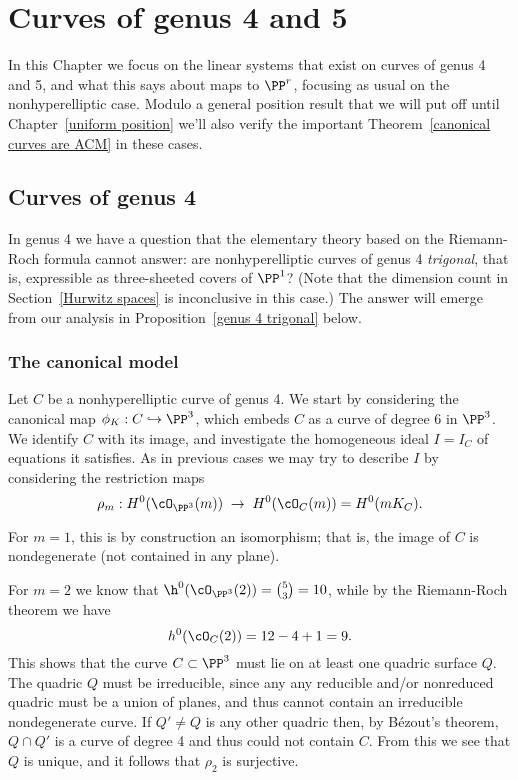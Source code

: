 

\chapter{Curves of genus 4 and 5}\label{genus 4, 5 Chapter}

In this Chapter we focus on the linear systems that exist on curves of genus 4 and 5, and what this says about maps to $\PP^r$, focusing as usual on the nonhyperelliptic case. Modulo a general position result that we will put off until Chapter~\ref{uniform position} we'll also verify the
important Theorem~\ref{canonical curves are ACM} in these cases.



\section{Curves of genus 4}

In genus 4 we have a question that the elementary theory based on the Riemann-Roch formula cannot answer: are nonhyperelliptic curves of genus 4 \emph{trigonal}, that is, expressible as three-sheeted covers of $\PP^1$? (Note that the dimension count in Section~\ref{Hurwitz spaces} is inconclusive in this case.)
The answer will emerge from our analysis in Proposition~\ref{genus 4 trigonal} below.

\subsection{The canonical model}\label{canonical genus 4}

Let $C$ be a nonhyperelliptic curve of genus 4. We start by considering the canonical map $\phi_K : C \hookrightarrow \PP^3$, which embeds $C$ as a curve of degree 6 in $\PP^3$. We identify $C$ with its image, and investigate the homogeneous ideal $I = I_C$ of equations it satisfies. As in previous cases we may try to describe $I$ by considering the restriction maps
$$
\rho_m : H^0(\cO_{\PP^3}(m)) \; \to \; H^0(\cO_{C}(m)) = H^0(mK_C).
$$

For $m=1$, this is by construction an isomorphism; that is, the image of $C$ is nondegenerate (not contained in any plane).

For $m=2$ we know that $\h^0(\cO_{\PP^3}(2)) = \binom{5}{3} = 10$, while by the Riemann-Roch
theorem we have
$$
h^0(\cO_C(2)) = 12 - 4 + 1 = 9.
$$
This shows that the curve $C \subset \PP^3$ must lie on at least one quadric surface $Q$. The quadric $Q$ must be irreducible, since any any reducible and/or nonreduced quadric must be a union of planes, and thus cannot contain an irreducible nondegenerate curve.
If $Q'\neq Q$ is any other quadric then, by B\'ezout's theorem, $Q\cap Q'$ is a curve of degree 4 and thus could not contain $C$. From this we see that $Q$ is unique, and it follows that $\rho_2$ is surjective.

